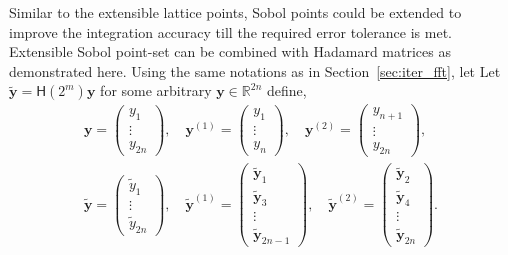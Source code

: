 \documentclass{iitthesis}          %
\newcommand{\bm}[1]{\boldsymbol{#1}}
\newcommand{\reals}{\mathbb{R}}
\newcommand{\vy}{\bm{y}}
\newcommand{\mH}{\mathsf{H}}
\newcommand\secref{Section~\ref}
\begin{document}
Similar to the extensible lattice points, Sobol points could be extended to improve the integration accuracy till the required error tolerance is met. Extensible Sobol point-set can be combined with Hadamard matrices as demonstrated here. Using the same notations as in \secref{sec:iter_fft}, let Let $\widetilde{\vy} = \mH({2^m}) {\vy}$ for some arbitrary $\vy \in \reals^{2n}$ define, 
\begin{gather*}
\vy = \begin{pmatrix} y_1 \\ \vdots \\ y_{2n} \end{pmatrix}, \quad 
\vy^{(1)} = \begin{pmatrix} y_1 \\ \vdots \\ y_{n} \end{pmatrix}, \quad 
\vy^{(2)}  = \begin{pmatrix} y_{n+1} \\ \vdots \\ y_{2n} \end{pmatrix}, \\ 
\widetilde{\vy} = \begin{pmatrix} \widetilde{y}_1 \\ \vdots \\ \widetilde{y}_{2n} \end{pmatrix}, \quad 
\widetilde{\vy}^{(1)} = \begin{pmatrix} \widetilde{\vy}_1 \\ \widetilde{\vy}_3 \\ \vdots \\ \widetilde{\vy}_{2n-1} \end{pmatrix}, \quad 
\widetilde{\vy}^{(2)}  = \begin{pmatrix} \widetilde{\vy}_{2} \\  \widetilde{\vy}_{4} \\ \vdots \\ \widetilde{\vy}_{2n} \end{pmatrix}. 
\end{gather*}
\end{document}
